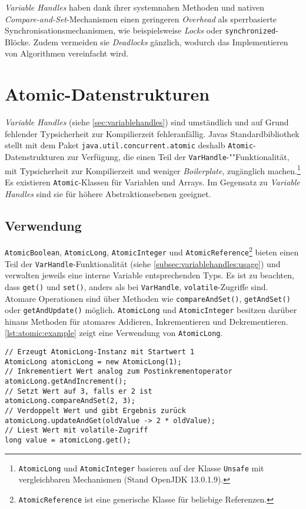 \documentclass[a4paper, 11pt]{article}
\begin{document}
\textit{Variable Handles} haben dank ihrer systemnahen Methoden und nativen \textit{Compare-and-Set}-Mechanismen einen geringeren \textit{Overhead} als sperrbasierte Synchronisationsmechanismen, wie beispielsweise \textit{Locks} oder \verb|synchronized|-Blöcke.
Zudem vermeiden sie \textit{Deadlocks} gänzlich, wodurch das Implementieren von Algorithmen vereinfacht wird.

\section{Atomic-Datenstrukturen}
\label{sec:atomic}

\textit{Variable Handles} (siehe \autoref{sec:variablehandles}) sind umständlich und auf Grund fehlender Typsicherheit zur Kompilierzeit fehleranfällig.
Javas Standardbibliothek stellt mit dem Paket \verb|java.util.concurrent.atomic| deshalb \verb|Atomic|-Datenstrukturen zur Verfügung, die einen Teil der \verb|VarHandle|-""Funktionalität, mit Typsicherheit zur Kompilierzeit und weniger \textit{Boilerplate}, zugänglich machen.\footnote{\verb|AtomicLong| und \verb|AtomicInteger| basieren auf der Klasse \verb|Unsafe| mit vergleichbaren Mechanismen (Stand OpenJDK 13.0.1.9).}
Es existieren \verb|Atomic|-Klassen für Variablen und Arrays.
Im Gegensatz zu \textit{Variable Handles} sind sie für höhere Abstraktionsebenen geeignet.

\subsection{Verwendung}
\label{subsec:atomic:usage}

\verb|AtomicBoolean|, \verb|AtomicLong|, \verb|AtomicInteger| und \verb|AtomicReference|\footnote{\verb|AtomicReference| ist eine generische Klasse für beliebige Referenzen.} bieten einen Teil der \verb|VarHandle|-Funktionalität (siehe \autoref{subsec:variablehandles:usage}) und verwalten jeweils eine interne Variable entsprechenden Typs.
Es ist zu beachten, dass \verb|get()| und \verb|set()|, anders als bei \verb|VarHandle|, \verb|volatile|-Zugriffe sind.
Atomare Operationen sind über Methoden wie \verb|compareAndSet()|, \verb|getAndSet()| oder \verb|getAndUpdate()| möglich.
\verb|AtomicLong| und \verb|AtomicInteger| besitzen darüber hinaus Methoden für atomares Addieren, Inkrementieren und Dekrementieren.
\autoref{lst:atomic:example} zeigt eine Verwendung von \verb|AtomicLong|.

\begin{lstfloat}
	\begin{lstlisting}[label={lst:atomic:example}, caption={Verwendung von AtomicLong}]
// Erzeugt AtomicLong-Instanz mit Startwert 1
AtomicLong atomicLong = new AtomicLong(1);
// Inkrementiert Wert analog zum Postinkrementoperator
atomicLong.getAndIncrement();
// Setzt Wert auf 3, falls er 2 ist
atomicLong.compareAndSet(2, 3);
// Verdoppelt Wert und gibt Ergebnis zurück
atomicLong.updateAndGet(oldValue -> 2 * oldValue);
// Liest Wert mit volatile-Zugriff
long value = atomicLong.get();
	\end{lstlisting}
\end{lstfloat}
\end{document}
